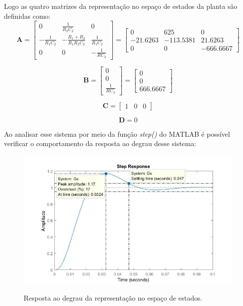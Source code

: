 \documentclass[
	article,			%
	11pt,				%
	oneside,			%
	a4paper,			%
	english,			%
	brazil,				%
	sumario=tradicional
	]{abntex2}
\begin{document}
Logo as quatro matrizes da representação no espaço de estados da planta são definidas como:
$$
\textbf{A} = \left[
\begin{array}{ccc}
0 & \frac{1}{R_2C_2} & 0 \\
-\frac{1}{R_1C_2} & -\frac{R_1+R_2}{R_1R_2C_2} &\frac{1}{R_1C_2} \\
0 & 0 & -\frac{1}{RC_3}
\end{array}
\right]
= 
\left[
\begin{array}{ccc}
0 & 625 & 0 \\
-21.6263 & -113.5381 & 21.6263 \\
0 & 0 & -666.6667
\end{array}
\right]
$$

$$
\textbf{B} = 
\left[
\begin{array}{ccc}
0 \\
0 \\
\frac{1}{RC_3}
\end{array}
\right]
= 
\left[
\begin{array}{ccc}
0 \\
0 \\
666.6667
\end{array}
\right]
$$

$$
\textbf{C} = 
\left[
\begin{array}{ccc}
1 & 0 & 0
\end{array}
\right]
$$

$$
\textbf{D} = 0
$$

Ao analisar esse sistema por meio da função \textit{step()} do MATLAB é possível verificar o comportamento da resposta ao degrau desse sistema:

\begin{figure}[htb!]
	\centering
	\caption{Resposta ao degrau da representação no espaço de estados.}
	\includegraphics[scale=0.525]{./img/sistemaTerceiraOrdem_step.JPG}
	\label{fig:sistemaTerceiraOrdem_step}
\end{figure}
\end{document}
